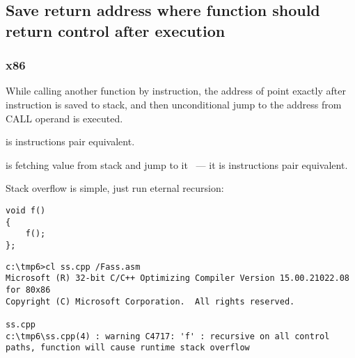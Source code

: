 
\subsection{
{Save return address where function should return control after execution}}

\subsubsection{x86}

{While calling another function by \CALL instruction, the address of point exactly after \CALL instruction is saved 
to stack, and then unconditional jump to the address from CALL operand is executed.} 

{\CALL is  instructions pair equivalent}.

{\RET is fetching value from stack and jump to it ~--- it is  instructions pair equivalent.}

{Stack overflow is simple, just run eternal recursion:}

\begin{lstlisting}
void f()
{
	f();
};
\end{lstlisting}


\begin{lstlisting}
c:\tmp6>cl ss.cpp /Fass.asm
Microsoft (R) 32-bit C/C++ Optimizing Compiler Version 15.00.21022.08 for 80x86
Copyright (C) Microsoft Corporation.  All rights reserved.

ss.cpp
c:\tmp6\ss.cpp(4) : warning C4717: 'f' : recursive on all control paths, function will cause runtime stack overflow
\end{lstlisting}

